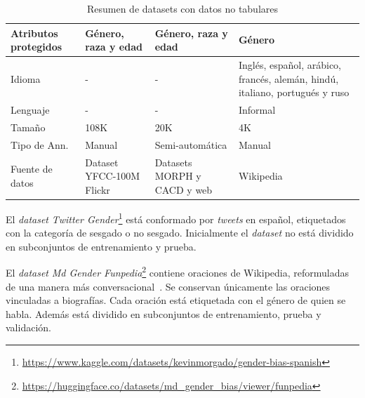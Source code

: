 \begin{table}[htpb]
{\begin{tabular}{lp{}p{}p{}}
                \midrule
                Atributos protegidos & G\'enero, raza y edad                            & G\'enero, raza y edad                               & G\'enero                        \\
                \midrule
                Idioma               & -                                                & -                                                   & Ingl\'es, espa\~nol, ar\'abico, franc\'es, alem\'an, hind\'u, italiano, portugu\'es y ruso\\
                \midrule
                Lenguaje             & -                                                & -                                                   & Informal                        \\
                \midrule
                Tama\~no             & 108K                                             & 20K                                                 & 4K                              \\
                \midrule
                Tipo de Ann.         & Manual                                           & Semi-autom\'atica                                   & Manual                          \\
                \midrule
                Fuente de datos      &  Dataset YFCC-100M Flickr                        & Datasets MORPH y CACD y web                         & Wikipedia                       \\
                \bottomrule
                \bottomrule
            \end{tabular}}
        \caption{Resumen de datasets con datos no tabulares}
        \label{table:datasets}
    \end{table}
    
    El \emph{dataset} \emph{Twitter Gender}\footnote{\url{https://www.kaggle.com/datasets/kevinmorgado/gender-bias-spanish}} est\'a conformado por 
    \emph{tweets} en espa\~nol, etiquetados con la categor\'ia de sesgado o no sesgado. Inicialmente el \emph{dataset} no est\'a dividido en subconjuntos de 
    entrenamiento y prueba.

    El \emph{dataset} \emph{Md Gender Funpedia}\footnote{\url{https://huggingface.co/datasets/md_gender_bias/viewer/funpedia}} contiene oraciones de 
    Wikipedia, reformuladas de una manera m\'as conversacional~\parencite{dinan2020multidimensional}. Se conservan \'unicamente las oraciones 
    vinculadas a biograf\'ias. Cada oraci\'on est\'a etiquetada con el g\'enero de quien se habla. Adem\'as est\'a dividido en subconjuntos de 
    entrenamiento, prueba y validaci\'on.

